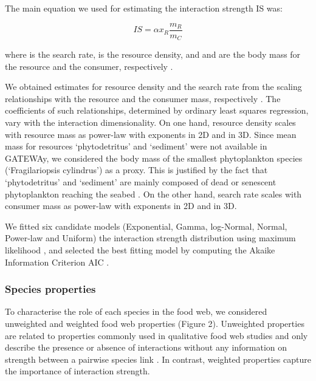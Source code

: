 \documentclass[gc, manuscript]{copernicus}
\begin{document}
The main equation we used for estimating the interaction strength IS
was:

\begin{equation}
IS = \alpha x_R \frac{m_R}{m_C}
\end{equation}

where \vec{\alpha} is the search rate,  is the resource
density, and  and  are the body mass for the resource
and the consumer, respectively \citep{Pawar2012}.

We obtained estimates for resource density and the search rate from the
scaling relationships with the resource and the consumer mass,
respectively \citep{Pawar2012}. The coefficients of such relationships,
determined by ordinary least squares regression, vary with the
interaction dimensionality. On one hand, resource density scales with
resource mass as power-law with exponents in 2D and in 3D. Since mean
mass for resources `phytodetritus' and `sediment' were not available in
GATEWAy, we considered the body mass of the smallest phytoplankton
species (`Fragilariopsis cylindrus') as a proxy. This is justified by
the fact that `phytodetritus' and `sediment' are mainly composed of dead
or senescent phytoplankton reaching the seabed \citep{Wolanski2011}. On
the other hand, search rate scales with consumer mass as power-law with
exponents in 2D and in 3D.

We fitted six candidate models (Exponential, Gamma, log-Normal, Normal,
Power-law and Uniform) the interaction strength distribution using
maximum likelihood \citep{McCallum2008}, and selected the best fitting
model by computing the Akaike Information Criterion AIC
\citep{Burnham2002}.

\subsubsection{Species properties}

To characterise the role of each species in the food web, we considered
unweighted and weighted food web properties (Figure 2). Unweighted
properties are related to properties commonly used in qualitative food
web studies and only describe the presence or absence of interactions
without any information on strength between a pairwise species link
\citep{Martinez1991, Dunne2002, Borrelli2014}. In contrast, weighted
properties capture the importance of interaction strength.
\end{document}
